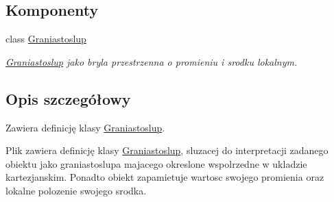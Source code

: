 \subsection*{Komponenty}
\begin{DoxyCompactItemize}
\item 
class \hyperlink{classGraniastoslup}{Graniastoslup}
\begin{DoxyCompactList}\small\item\em \hyperlink{classGraniastoslup}{Graniastoslup} jako bryla przestrzenna o promieniu i srodku lokalnym. \end{DoxyCompactList}\end{DoxyCompactItemize}


\subsection{Opis szczegółowy}
Zawiera definicję klasy \hyperlink{classGraniastoslup}{Graniastoslup}. 

Plik zawiera definicję klasy \hyperlink{classGraniastoslup}{Graniastoslup}, sluzacej do interpretacji zadanego obiektu jako graniastoslupa majacego okreslone wspolrzedne w ukladzie kartezjanskim. Ponadto obiekt zapamietuje wartosc swojego promienia oraz lokalne polozenie swojego srodka. 